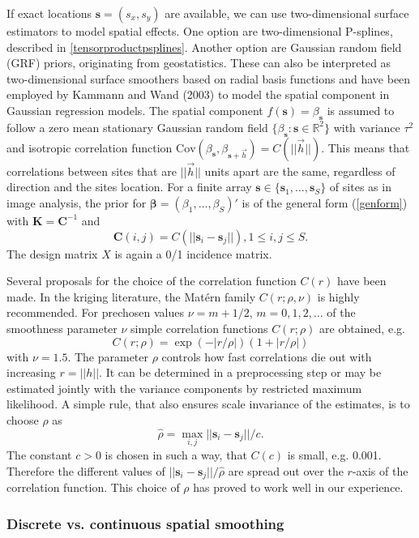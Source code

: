 \documentclass[11pt,a4paper,twoside]{bayesxarticle}
\newcommand{\Cov}{\mbox{Cov}}
\def \Kvec {\vec{K}}
\def \betavec {\boldsymbol{\beta}}
\def \svec {\mathbf{s}}
\def \Cvec {\mathbf{C}}
\def \Kvec {\mathbf{K}}
\def \svec {\mathbf{s}}
\def \Cvec {\mathbf{C}}
\def \hvec {\vec{h}}
\begin{document}
If exact locations $\svec=(s_x,s_y)$ are available, we can use
two-dimensional surface estimators to model spatial effects. One
option are two-dimensional P-splines, described in
\autoref{tensorproductpsplines}. Another option are Gaussian random
field (GRF) priors, originating from geostatistics. These can also
be interpreted as two-dimensional surface smoothers based on radial
basis functions and have been employed by Kammann and Wand (2003) to
model the spatial component in Gaussian regression models. The
spatial component $f(\svec)=\beta_\svec$ is assumed to follow a zero
mean stationary Gaussian random field
$\{\beta_\svec:\svec\in\mathbb{R}^2\}$ with variance $\tau^2$ and
isotropic correlation function
$\Cov(\beta_\svec,\beta_{\svec+\hvec})=C(||\hvec||)$. This means
that correlations between sites that are $||\hvec||$ units apart are
the same, regardless of direction and the sites location. For a
finite array $\svec\in\{\svec_1,\ldots,\svec_S\}$ of sites as in
image analysis, the prior for $\betavec=(\beta_1,\ldots,\beta_S)'$
is of the general form (\ref{genform}) with $\Kvec=\Cvec^{-1}$ and
\[\Cvec(i,j)=C(||\svec_i-\svec_j||), 1\le i,j\le S.\]
The design matrix $X$ is again a 0/1 incidence matrix.

Several proposals for the choice of the correlation function
$C(r)$ have been made. In the kriging literature, the Mat\'{e}rn
family $C(r;\rho,\nu)$ is highly recommended. For prechosen values $\nu=m+1/2$,
$m=0,1,2,\ldots$ of the smoothness parameter $\nu$ simple
correlation functions $C(r;\rho)$ are obtained, e.g.
\[C(r;\rho)=\exp(-|r/\rho|)(1+|r/\rho|)\]
with $\nu=1.5$. The parameter $\rho$ controls how fast correlations
die out with increasing $r=||h||$. It can be determined in a
preprocessing step or may be estimated jointly with the variance
components by restricted maximum likelihood. A simple rule, that
also ensures scale invariance of the estimates, is to choose $\rho$
as
\[\hat{\rho}=\max_{i,j}||\svec_i-\svec_j||/c.\]
The constant $c>0$ is chosen in such a way, that $C(c)$ is small,
e.g. 0.001. Therefore the different values of
$||\svec_i-\svec_j||/\hat{\rho}$ are spread out over the $r$-axis of
the correlation function. This choice of $\rho$ has proved to work
well in our experience.

\subsubsection{Discrete vs. continuous spatial smoothing}
\end{document}
